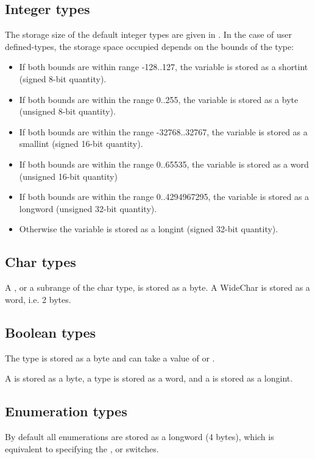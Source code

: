\subsection{Integer types}

The storage size of the default integer types are given in
. In the case of user defined-types, the storage space
occupied depends on the bounds of the type:

\begin{itemize}
\item If both bounds are within range -128..127, the variable
is stored as a shortint (signed 8-bit quantity).
\item If both bounds are within the range 0..255, the variable
is stored as a byte (unsigned 8-bit quantity).
\item If both bounds are within the range -32768..32767, the variable
is stored as a smallint (signed 16-bit quantity).
\item If both bounds are within the range 0..65535, the variable
is stored as a word (unsigned 16-bit quantity)
\item If both bounds are within the range 0..4294967295, the
variable is stored as a longword (unsigned 32-bit quantity).
\item Otherwise the variable is stored as a longint (signed
32-bit quantity).
\end{itemize}

\subsection{Char types}

A , or a subrange of the char type, is stored
as a byte. A WideChar is stored as a word, i.e. 2 bytes.

\subsection{Boolean types}
The  type is stored as a byte and can take
a value of  or .

A  is stored as a byte, a 
type is stored as a word, and a  is stored
as a longint.

\subsection{Enumeration types}

By default all enumerations are stored as a
longword (4 bytes), which is equivalent to specifying
the ,  or
 switches.

